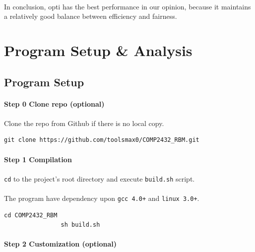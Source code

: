 \documentclass{article}
\begin{document}
    \paragraph{}
        In conclusion, opti has the best performance in our opinion, because it maintains a relatively good balance between efficiency and fairness.
    \cleardoublepage
    \section{Program Setup \& Analysis}
        \subsection{Program Setup}
            \paragraph{Step 0 Clone repo (optional)}
            \paragraph{}
                Clone the repo from Github if there is no local copy.
            \begin{Verbatim}[gobble=8]
                git clone https://github.com/toolsmax0/COMP2432_RBM.git
            \end{Verbatim}
            \paragraph{Step 1 Compilation}
            \paragraph{}
                \texttt{cd} to the project's root directory and execute \texttt{build.sh} script.
            \paragraph{}
                The program have dependency upon \texttt{gcc 4.0+} and \texttt{linux 3.0+}.
            \begin{Verbatim}[gobble=8]
                cd COMP2432_RBM
                sh build.sh
            \end{Verbatim}
            \paragraph{Step 2 Customization (optional)}
\end{document}
